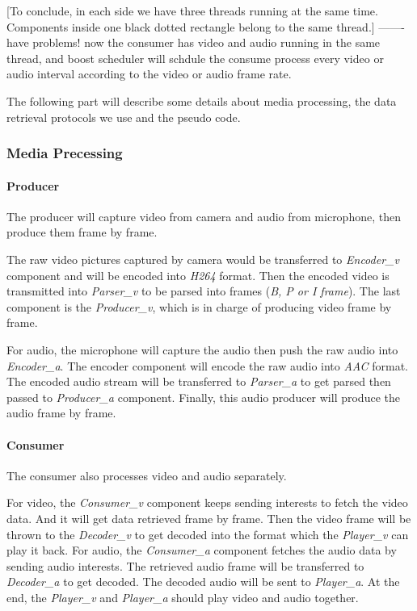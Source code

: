 [To conclude, in each side we have three threads running at the same time. Components inside one black dotted rectangle belong to the same thread.] ------- have problems! now the consumer has video and audio running in the same thread, and boost scheduler will schdule the consume process every video or audio interval according to the video or audio frame rate. 

The following part will describe some details about media processing, the data retrieval protocols we use and the pseudo code.
\subsubsection {Media Precessing}
\paragraph {Producer}
The producer will capture video from camera and audio from microphone, then produce them frame by frame.

The raw video pictures captured by camera would be transferred to \textit{Encoder\_v} component and will be encoded into \textit{H264} format. Then the encoded video is transmitted into \textit{Parser\_v} to be parsed into frames (\textit{B, P or I frame}). The last component is the \textit{Producer\_v}, which is in charge of producing video frame by frame.

For audio, the microphone will capture the audio then push the raw audio into \textit{Encoder\_a}. The encoder component will encode the raw audio into \textit{AAC} format. The encoded audio stream will be transferred to \textit{Parser\_a} to get parsed then passed to \textit{Producer\_a} component. Finally, this audio producer will produce the audio frame by frame.

\paragraph {Consumer}
The consumer also processes video and audio separately.

For video, the \textit{Consumer\_v} component keeps sending interests to fetch the video data. And it will get data retrieved frame by frame. Then the video frame will be thrown to the \textit{Decoder\_v} to get decoded into the format which the \textit{Player\_v} can play it back.
For audio, the \textit{Consumer\_a} component fetches the audio data by sending audio interests. The retrieved audio frame will be transferred to \textit{Decoder\_a} to get decoded. The decoded audio will be sent to \textit{Player\_a}. At the end, the \textit{Player\_v} and \textit{Player\_a} should play video and audio together.

